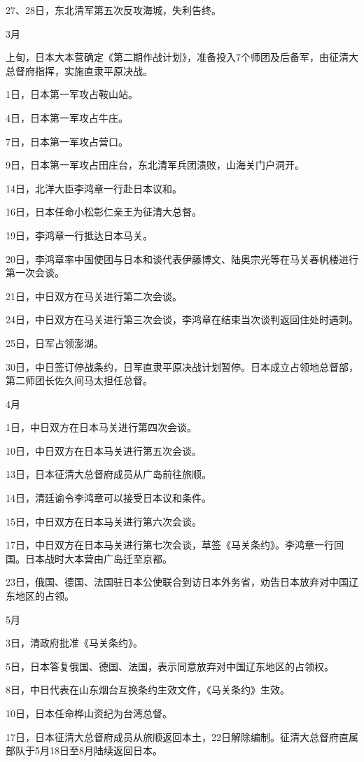 \documentclass[12pt,UTF8]{ctexbook}
\begin{document}
27、28日，东北清军第五次反攻海城，失利告终。

3月

上旬，日本大本营确定《第二期作战计划》，准备投入7个师团及后备军，由征清大总督府指挥，实施直隶平原决战。

1日，日本第一军攻占鞍山站。

4日，日本第一军攻占牛庄。

7日，日本第一军攻占营口。

9日，日本第一军攻占田庄台，东北清军兵团溃败，山海关门户洞开。

14日，北洋大臣李鸿章一行赴日本议和。

16日，日本任命小松彰仁亲王为征清大总督。

19日，李鸿章一行抵达日本马关。

20日，李鸿章率中国使团与日本和谈代表伊藤博文、陆奥宗光等在马关春帆楼进行第一次会谈。

21日，中日双方在马关进行第二次会谈。

24日，中日双方在马关进行第三次会谈，李鸿章在结束当次谈判返回住处时遇刺。

25日，日军占领澎湖。

30日，中日签订停战条约，日军直隶平原决战计划暂停。日本成立占领地总督部，第二师团长佐久间马太担任总督。

4月

1日，中日双方在日本马关进行第四次会谈。

10日，中日双方在日本马关进行第五次会谈。

13日，日本征清大总督府成员从广岛前往旅顺。

14日，清廷谕令李鸿章可以接受日本议和条件。

15日，中日双方在日本马关进行第六次会谈。

17日，中日双方在日本马关进行第七次会谈，草签《马关条约》。李鸿章一行回国。日本战时大本营由广岛迁至京都。

23日，俄国、德国、法国驻日本公使联合到访日本外务省，劝告日本放弃对中国辽东地区的占领。

5月

3日，清政府批准《马关条约》。

5日，日本答复俄国、德国、法国，表示同意放弃对中国辽东地区的占领权。

8日，中日代表在山东烟台互换条约生效文件，《马关条约》生效。

10日，日本任命桦山资纪为台湾总督。

17日，日本征清大总督府成员从旅顺返回本土，22日解除编制。征清大总督府直属部队于5月18日至8月陆续返回日本。
\end{document}
